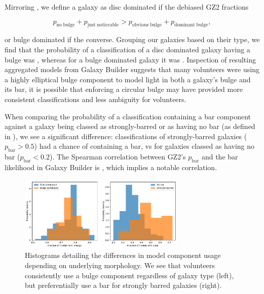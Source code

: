 \documentclass[../main.tex]{subfiles}
\begin{document}
Mirroring \citet{Kruk2017:1710.00093v2}, we define a galaxy as disc dominated if the debiased GZ2 fractions

\begin{equation}
p_\mathrm{no\; bulge} + p_\mathrm{just\; noticeable} > p_\mathrm{obvious\; bulge} + p_\mathrm{dominant\; bulge},
\end{equation}

or bulge dominated if the converse. Grouping our galaxies based on their type, we find that the probability of a classification of a disc dominated galaxy having a bulge was , whereas for a bulge dominated galaxy it was . Inspection of resulting aggregated models from Galaxy Builder suggests that many volunteers were using a highly elliptical bulge component to model light in both a galaxy's bulge and its bar, it is possible that enforcing a circular bulge may have provided more consistent classifications and less ambiguity for volunteers.

When comparing the probability of a classification containing a bar component against a galaxy being classed as strongly-barred or as having no bar (as defined in \citealt{Masters2010:1003.0449v2}), we see a significant difference: classifications of strongly-barred galaxies ($p_\text{bar} > 0.5$) had a  chance of containing a bar, vs  for galaxies classed as having no bar ($p_\text{bar} < 0.2$). The Spearman correlation between GZ2's $p_\text{bar}$ and the bar likelihood in Galaxy Builder is , which implies a notable correlation.

\begin{figure}
  \includegraphics[width=8cm]{images__results/bulge-bar-population-comparison.pdf}
  \caption{Histograms detailing the differences in model component usage depending on underlying morphology. We see that volunteers consistently use a bulge component regardless of galaxy type (left), but preferentially use a bar for strongly barred galaxies (right).}
  \label{fig:bulge_bar_comparison}
\end{figure}
\end{document}
